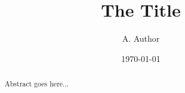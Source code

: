 \documentclass{article}
\title{The Title}
\author{A. Author}
\date{\today}
\begin{document}
\maketitle

\begin{abstract} 
	Abstract goes here... 
\end{abstract}
\end{document}
